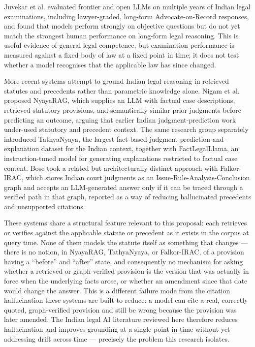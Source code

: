 Juvekar et al. \cite{juvekar2025courtready} evaluated frontier and open LLMs on multiple years of Indian legal examinations, including lawyer-graded, long-form Advocate-on-Record responses, and found that models perform strongly on objective questions but do not yet match the strongest human performance on long-form legal reasoning. This is useful evidence of general legal competence, but examination performance is measured against a fixed body of law at a fixed point in time; it does not test whether a model recognises that the applicable law has since changed.

More recent systems attempt to ground Indian legal reasoning in retrieved statutes and precedents rather than parametric knowledge alone. Nigam et al. \cite{nigam2025nyayarag} proposed NyayaRAG, which supplies an LLM with factual case descriptions, retrieved statutory provisions, and semantically similar prior judgments before predicting an outcome, arguing that earlier Indian judgment-prediction work under-used statutory and precedent context. The same research group \cite{nigam2025tathyanyaya} separately introduced TathyaNyaya, the largest fact-based judgment-prediction-and-explanation dataset for the Indian context, together with FactLegalLlama, an instruction-tuned model for generating explanations restricted to factual case content. Bose \cite{bose2026falkorirac} took a related but architecturally distinct approach with Falkor-IRAC, which stores Indian court judgments as an Issue-Rule-Analysis-Conclusion graph and accepts an LLM-generated answer only if it can be traced through a verified path in that graph, reported as a way of reducing hallucinated precedents and unsupported citations.

These systems share a structural feature relevant to this proposal: each retrieves or verifies against the applicable statute or precedent as it exists in the corpus at query time. None of them models the statute itself as something that changes — there is no notion, in NyayaRAG, TathyaNyaya, or Falkor-IRAC, of a provision having a “before” and “after” state, and consequently no mechanism for asking whether a retrieved or graph-verified provision is the version that was actually in force when the underlying facts arose, or whether an amendment since that date would change the answer. This is a different failure mode from the citation hallucination these systems are built to reduce: a model can cite a real, correctly quoted, graph-verified provision and still be wrong because the provision was later amended. The Indian legal AI literature reviewed here therefore reduces hallucination and improves grounding at a single point in time without yet addressing drift across time — precisely the problem this research isolates.

